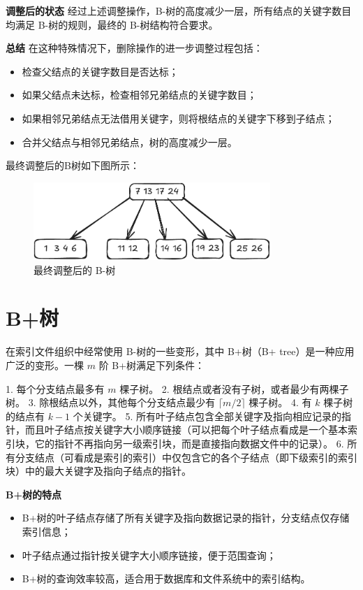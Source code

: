 \documentclass[lang=cn,newtx,10pt,scheme=chinese]{../elegantbook}
\begin{document}
\textbf{调整后的状态}  
经过上述调整操作，B-树的高度减少一层，所有结点的关键字数目均满足 B-树的规则，最终的 B-树结构符合要求。


\textbf{总结}  
在这种特殊情况下，删除操作的进一步调整过程包括：
\begin{itemize}
  \item 检查父结点的关键字数目是否达标；
  \item 如果父结点未达标，检查相邻兄弟结点的关键字数目；
  \item 如果相邻兄弟结点无法借用关键字，则将根结点的关键字下移到子结点；
  \item 合并父结点与相邻兄弟结点，树的高度减少一层。
\end{itemize}

最终调整后的B树如下图所示：

\begin{figure}[h!]
    \centering
    \includegraphics[width=0.8\textwidth]{./figure/pdf/cropped/Btree_del6.pdf}
    \caption{最终调整后的 B-树}
    \label{fig:Btree_final}

\end{figure}
\section{B+树}
在索引文件组织中经常使用 B-树的一些变形，其中 B+树（B+ tree）是一种应用广泛的变形。一棵 $m$ 阶 B+树满足下列条件：

1. 每个分支结点最多有 $m$ 棵子树。
2. 根结点或者没有子树，或者最少有两棵子树。
3. 除根结点以外，其他每个分支结点最少有 $\lceil m/2 \rceil$ 棵子树。
4. 有 $k$ 棵子树的结点有 $k-1$ 个关键字。
5. 所有叶子结点包含全部关键字及指向相应记录的指针，而且叶子结点按关键字大小顺序链接（可以把每个叶子结点看成是一个基本索引块，它的指针不再指向另一级索引块，而是直接指向数据文件中的记录）。
6. 所有分支结点（可看成是索引的索引）中仅包含它的各个子结点（即下级索引的索引块）中的最大关键字及指向子结点的指针。


\textbf{B+树的特点}  
\begin{itemize}
  \item B+树的叶子结点存储了所有关键字及指向数据记录的指针，分支结点仅存储索引信息；
  \item 叶子结点通过指针按关键字大小顺序链接，便于范围查询；
  \item B+树的查询效率较高，适合用于数据库和文件系统中的索引结构。
\end{itemize}
\end{document}
